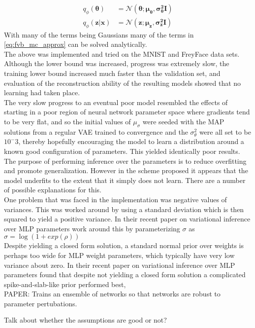 \documentclass[../report.tex]{subfiles}
\begin{document}
\begin{equation}
\begin{split}
q_\phi(\mathbf{\theta}) & = \mathcal{N}(\mathbf{\theta}; \mathbf{\mu}_\mathbf{\theta}, \mathbf{\sigma^2_\theta}\mathbf{I})\\
q_\phi(\mathbf{z|x}) & = \mathcal{N}(\mathbf{z}; \mathbf{\mu}_\mathbf{z}, \mathbf{\sigma^2_z}\mathbf{I})
\end{split}
\end{equation}
With many of the terms being Gaussians many of the terms in \cref{eq:fvb_mc_approx} can be solved analytically.\\
The above was implemented and tried on the MNIST and FreyFace data sets. Although the lower bound was increased, progress was extremely slow, the training lower bound increased much faster than the validation set, and evaluation of the reconstruction ability of the resulting models showed that no learning had taken place.\\
The very slow progress to an eventual poor model resembled the effects of starting in a poor region of neural network parameter space where gradients tend to be very flat, and so the initial values of $\mu_\sigma$ were seeded with the MAP solutions from a regular VAE trained to convergence and the $\sigma_\theta^2$ were all set to be $10^-3$, thereby hopefully encouraging the model to learn a distribution around a known good configuration of parameters. This yielded identically poor results.\\
The purpose of performing inference over the parameters is to reduce overfitting and promote generalization. However in the scheme proposed it appears that the model underfits to the extent that it simply does not learn. There are a number of possible explanations for this.\\
One problem that was faced in the implementation was negative values of variances. This was worked around by using a standard deviation which is then squared to yield a positive variance. In their recent paper on variational inference over MLP parameters \cite{blundell2015weight} work around this by parameterizing $\sigma$ as $\sigma = \log(1 + exp(\rho))$\\
Despite yielding a closed form solution, a standard normal prior over weights is perhaps too wide for MLP weight parameters, which typically have very low variance about zero. In their recent paper on variational inference over MLP parameters \cite{blundell2015weight} found that despite not yielding a closed form solution a complicated spike-and-slab-like prior performed best, \\


PAPER:
Trains an ensemble of networks so that networks are robust to parameter pertubations.

Talk about whether the assumptions are good or not?
\end{document}
